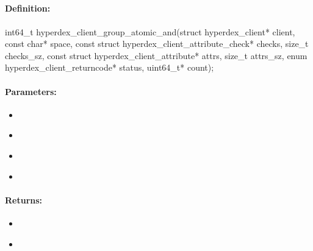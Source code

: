 \pagebreak
\subsection{}
\label{api:c:group_atomic_and}


\paragraph{Definition:}
\begin{ccode}
int64_t hyperdex_client_group_atomic_and(struct hyperdex_client* client,
        const char* space,
        const struct hyperdex_client_attribute_check* checks, size_t checks_sz,
        const struct hyperdex_client_attribute* attrs, size_t attrs_sz,
        enum hyperdex_client_returncode* status,
        uint64_t* count);
\end{ccode}

\paragraph{Parameters:}
\begin{itemize}[noitemsep]
\item {}\\

\item {}\\

\item {}\\

\item {}\\

\end{itemize}

\paragraph{Returns:}
\begin{itemize}[noitemsep]
\item {}\\

\item {}\\

\end{itemize}

